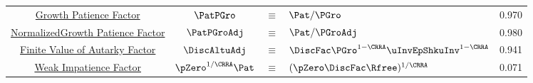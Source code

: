 \begin{table}
{\begin{tabular}{|c|ccl|c|}
\href{https://\owner.github.io/BufferStockTheory\#PFGPNew}{\phantom{Normalized~}Growth Patience Factor}    & $\PatPGro$ & $\equiv$ & $\Pat/\PGro $      & 0.970 \\
\href{https://\owner.github.io/BufferStockTheory\#GPF}{NormalizedGrowth Patience Factor}                      & $\PatPGroAdj$ & $\equiv$ & $ \Pat/\PGroAdj$& 0.980 \\
\href{https://\owner.github.io/BufferStockTheory\#FVAF}{Finite Value of Autarky Factor}         & $\DiscAltuAdj $ & $\equiv$ & $ \DiscFac \PGro^{1-\CRRA}\uInvEpShkuInv^{1-\CRRA}$       & 0.941 \\
\href{https://\owner.github.io/BufferStockTheory\#WRICCond}{Weak Impatience Factor}         & $\pZero^{1/\CRRA} \Pat $ & $\equiv$ & $ (\pZero \DiscFac \Rfree)^{1/\CRRA}$       & 0.071 \\ \hline
\end{tabular}
} %
\settowidth\TableWidth{\usebox{\Calibration}}
\usebox{\Calibration}

\end{table}
